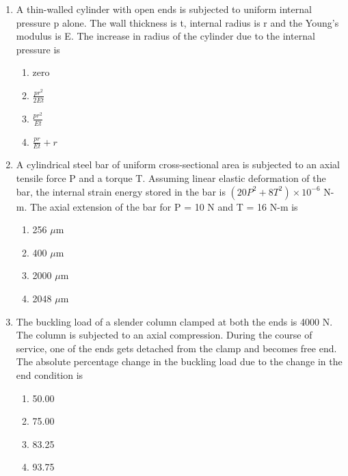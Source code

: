 \documentclass[a4paper,10pt]{article}
\begin{document}
\begin{enumerate}
\item A thin-walled cylinder with open ends is subjected to uniform internal pressure p alone. The wall thickness is t, internal radius is r and the Young's modulus is E. The increase in radius of the cylinder due to the internal pressure is
\hfill{}

\begin{multicols}{2}
\begin{enumerate}
\item zero
\item $\frac{pr^2}{2Et}$
\item $\frac{pr^2}{Et}$
\item $\frac{pr}{Et} + r$
\end{enumerate}
\end{multicols}

\item A cylindrical steel bar of uniform cross-sectional area is subjected to an axial tensile force P and a torque T. Assuming linear elastic deformation of the bar, the internal strain energy stored in the bar is $(20P^2 + 8T^2) \times 10^{-6}$ N-m. The axial extension of the bar for P = 10 N and T = 16 N-m is
\hfill{}

\begin{multicols}{4}
\begin{enumerate}
\item 256 $\mu$m
\item 400 $\mu$m
\item 2000 $\mu$m
\item 2048 $\mu$m
\end{enumerate}
\end{multicols}

\item The buckling load of a slender column clamped at both the ends is 4000 N. The column is subjected to an axial compression. During the course of service, one of the ends gets detached from the clamp and becomes free end. The absolute percentage change in the buckling load due to the change in the end condition is
\hfill{}

\begin{multicols}{4}
\begin{enumerate}
\item 50.00
\item 75.00
\item 83.25
\item 93.75
\end{enumerate}
\end{multicols}


\end{enumerate}
\end{document}
